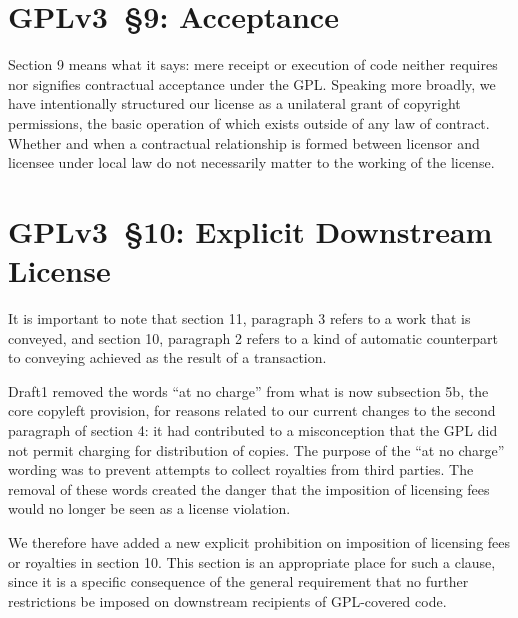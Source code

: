\section{GPLv3~\S9: Acceptance}


Section 9 means what it says: mere receipt or execution of code neither
requires nor signifies contractual acceptance under the GPL.  Speaking more
broadly, we have intentionally structured our license as a unilateral grant
of copyright permissions, the basic operation of which exists outside of any
law of contract.  Whether and when a contractual relationship is formed
between licensor and licensee under local law do not necessarily matter to
the working of the license.

\section{GPLv3~\S10: Explicit Downstream License}


It is important to note that section 11, paragraph 3 refers to a work that is
conveyed, and section 10, paragraph 2 refers to a kind of automatic
counterpart to conveying achieved as the result of a transaction. 


Draft1 removed the words ``at no charge'' from what is now subsection 5b, the
core copyleft provision, for reasons related to our current changes to the
second paragraph of section 4: it had contributed to a misconception that the
GPL did not permit charging for distribution of copies.  The purpose of the
``at no charge'' wording was to prevent attempts to collect royalties from
third parties.  The removal of these words created the danger that the
imposition of licensing fees would no longer be seen as a license
violation.

We therefore have added a new explicit prohibition on imposition of licensing
fees or royalties in section 10.  This section is an appropriate place for
such a clause, since it is a specific consequence of the general requirement
that no further restrictions be imposed on downstream recipients of
GPL-covered code.

